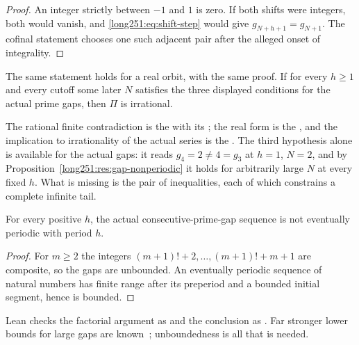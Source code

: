\documentclass[11pt]{article}
\begin{document}
\begin{proof}
An integer strictly between $-1$ and $1$ is zero.  If both shifts were
integers, both would vanish, and \eqref{long251:eq:shift-step} would give
$g_{N+h+1}=g_{N+1}$.  The cofinal statement chooses one such adjacent pair
after the alleged onset of integrality.
\end{proof}

\begin{corollary}\label{long251:res:smallpair-real}
The same statement holds for a real orbit, with the same proof.  If for every
$h\ge1$ and every cutoff some later $N$ satisfies the three displayed
conditions for the actual prime gaps, then $\Pi$ is irrational.
\end{corollary}

\noindent The rational finite contradiction is the
 with its
; the real form is the
, and the implication to irrationality of the actual
series is the
.  The third hypothesis alone is available for the actual gaps: it
reads $g_4=2\ne4=g_3$ at $h=1$, $N=2$, and by
Proposition~\ref{long251:res:gap-nonperiodic} it holds for arbitrarily large $N$ at
every fixed $h$.  What is missing is the pair of inequalities, each of which
constrains a complete infinite tail.

\begin{proposition}\label{long251:res:gap-nonperiodic}
For every positive $h$, the actual consecutive-prime-gap sequence is not
eventually periodic with period $h$.
\end{proposition}

\begin{proof}
For $m\ge2$ the integers $(m+1)!+2,\ldots,(m+1)!+m+1$ are composite, so the
gaps are unbounded.  An eventually periodic sequence of natural numbers has
finite range after its preperiod and a bounded initial segment, hence is
bounded.
\end{proof}

\noindent Lean checks the factorial argument as
 and the conclusion as
.  Far stronger lower bounds for large gaps are
known~\cite[Theorem~1, p.~66]{fgkmt2018}; unboundedness is all that is needed.
\end{document}
